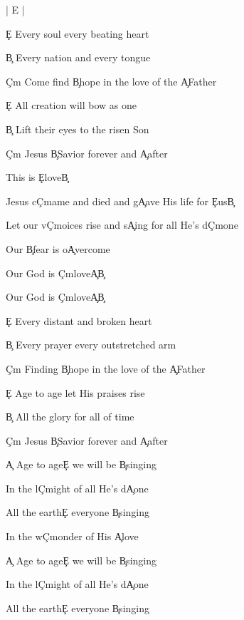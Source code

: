 \documentclass[9pt]{extarticle}
\begin{document}
\bsong

\bi
| E |
\ei

\bv
\c{E} Every soul every beating heart

\c{B} Every nation and every tongue

\c{C\s m} Come find \c{B}hope in the love of the \c{A}Father
\ev

\bv
\c{E} All creation will bow as one

\c{B} Lift their eyes to the risen Son

\c{C\s m} Jesus \c{B}Savior forever and \c{A}after
\ev

\bc
This is \c{E}love\c{B}

Jesus c\c{C\s m}ame and died and g\c{A}ave His life for \c{E}us\c{B}

Let our v\c{C\s m}oices rise and s\c{A}ing for all He's d\c{C\s m}one

Our \c{B}fear is o\c{A}vercome

Our God is \c{C\s m}love\c{A}\c{B}

Our God is \c{C\s m}love\c{A}\c{B}
\ec

\bv
\c{E} Every distant and broken heart

\c{B} Every prayer every outstretched arm

\c{C\s m} Finding \c{B}hope in the love of the \c{A}Father
\ev

\bv
\c{E} Age to age let His praises rise

\c{B} All the glory for all of time

\c{C\s m} Jesus \c{B}Savior forever and \c{A}after
\ev


\bb
\c{A} Age to age\c{E} we will be \c{B}singing

In the l\c{C\s m}ight of all He's d\c{A}one

All the earth\c{E} everyone \c{B}singing

In the w\c{C\s m}onder of His \c{A}love
\eb

\bb
\c{A} Age to age\c{E} we will be \c{B}singing

In the l\c{C\s m}ight of all He's d\c{A}one

All the earth\c{E} everyone \c{B}singing
\eb


\esong
\end{document}
